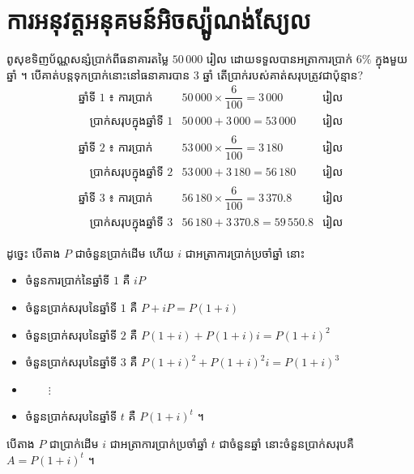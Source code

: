 \section{ការអនុវត្តអនុគមន៍អិចស្ប៉ូណង់ស្យែល}

\begin{example}[ឧទាហរណ៍]
ពូសុខទិញប័ណ្ណសន្សំប្រាក់ពីធនាគារតម្លៃ $50\,000$ រៀល ដោយទទួលបានអត្រាការប្រាក់ $6\%$ ក្នុងមួយឆ្នាំ ។ បើគាត់បន្តទុកប្រាក់នោះនៅធនាគារបាន $3$ ឆ្នាំ តើប្រាក់របស់គាត់សរុបត្រូវជាប៉ុន្មាន?
\[
\begin{array}{lll}
\text{ឆ្នាំទី } 1 \text{ ៖ ការប្រាក់} & 50\,000 \times \dfrac{6}{100} = 3\,000 & \text{រៀល}\\[2mm]
\quad\text{ប្រាក់សរុបក្នុងឆ្នាំទី } 1 & 50\,000 + 3\,000 = 53\,000 & \text{រៀល}\\[2mm]
\text{ឆ្នាំទី } 2 \text{ ៖ ការប្រាក់} & 53\,000 \times \dfrac{6}{100} = 3\,180 & \text{រៀល}\\[2mm]
\quad\text{ប្រាក់សរុបក្នុងឆ្នាំទី } 2 & 53\,000 + 3\,180 = 56\,180 & \text{រៀល}\\[2mm]
\text{ឆ្នាំទី } 3 \text{ ៖ ការប្រាក់} & 56\,180 \times \dfrac{6}{100} = 3\,370.8 & \text{រៀល}\\[2mm]
\quad\text{ប្រាក់សរុបក្នុងឆ្នាំទី } 3 & 56\,180 + 3\,370.8 = 59\,550.8 & \text{រៀល}
\end{array}
\]
\end{example}

ដូច្នេះ បើតាង $P$ ជាចំនួនប្រាក់ដើម ហើយ $i$ ជាអត្រាការប្រាក់ប្រចាំឆ្នាំ នោះ
\begin{itemize}
  \item ចំនួនការប្រាក់នៃឆ្នាំទី $1$ គឺ $iP$
  \item ចំនួនប្រាក់សរុបនៃឆ្នាំទី $1$ គឺ $P + iP = P(1 + i)$
  \item ចំនួនប្រាក់សរុបនៃឆ្នាំទី $2$ គឺ $P(1 + i) + P(1 + i)i = P(1 + i)^2$
  \item ចំនួនប្រាក់សរុបនៃឆ្នាំទី $3$ គឺ $P(1 + i)^2 + P(1 + i)^2i = P(1 + i)^3$
  \item[] $\qquad\vdots$
  \item ចំនួនប្រាក់សរុបនៃឆ្នាំទី $t$ គឺ $P(1 + i)^t$ ។
\end{itemize}

\begin{formulaBox}[ជាទូទៅ]
បើតាង $P$ ជាប្រាក់ដើម $i$ ជាអត្រាការប្រាក់ប្រចាំឆ្នាំ $t$ ជាចំនួនឆ្នាំ នោះចំនួនប្រាក់សរុបគឺ $A = P(1 + i)^t$ ។
\end{formulaBox}


